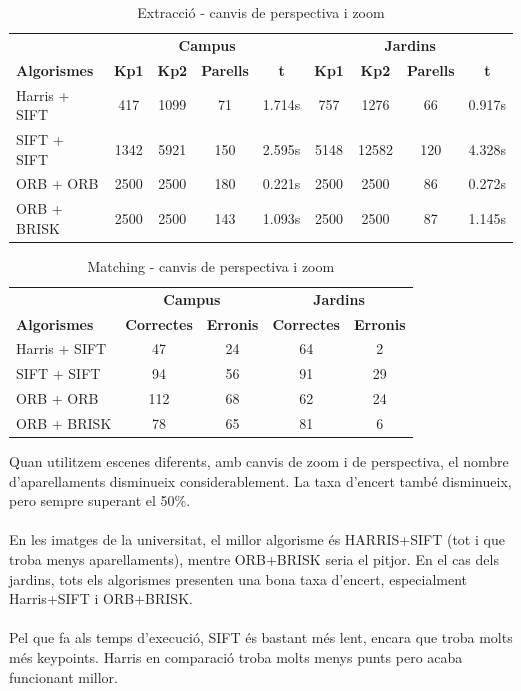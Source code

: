 		\begin{table}[H]
			\begin{center}
				\begin{tabular}{l | c c c c | c c c c}
					& \multicolumn{4}{c|}{\textbf{Campus}} & \multicolumn{4}{c}{\textbf{Jardins}} \\
					\textbf{Algorismes} & \textbf{Kp1} & \textbf{Kp2} & \textbf{Parells} & \textbf{t} & \textbf{Kp1} & \textbf{Kp2} & \textbf{Parells} & \textbf{t} \\ \hline
					Harris + SIFT & 417 & 1099 & 71 & 1.714s & 757 & 1276 & 66 & 0.917s \\
					SIFT + SIFT & 1342 & 5921 & 150 & 2.595s & 5148 & 12582 & 120 & 4.328s \\
					ORB + ORB & 2500 & 2500 & 180 & 0.221s & 2500 & 2500 & 86 & 0.272s \\
					ORB + BRISK & 2500 & 2500 & 143 & 1.093s & 2500 & 2500 & 87 & 1.145s \\
				\end{tabular}
			\end{center}
			\caption{Extracció - canvis de perspectiva i zoom}
		\end{table}

		\begin{table}[H]
			\begin{center}
				\begin{tabular}{l | c c | c c}
					& \multicolumn{2}{c|}{\textbf{Campus}} & \multicolumn{2}{c}{\textbf{Jardins}} \\
					\textbf{Algorismes} & \textbf{Correctes} & \textbf{Erronis} & \textbf{Correctes} & \textbf{Erronis} \\ \hline
					Harris + SIFT & 47 & 24 & 64 & 2 \\
					SIFT + SIFT & 94 & 56 & 91 & 29 \\
					ORB + ORB & 112 & 68 & 62 & 24 \\
					ORB + BRISK & 78 & 65 & 81 & 6 \\
				\end{tabular}
			\end{center}
			\caption{Matching - canvis de perspectiva i zoom}
		\end{table}
		\noindent
		Quan utilitzem escenes diferents, amb canvis de zoom i de perspectiva, el nombre d'aparellaments disminueix considerablement. La taxa d'encert també disminueix, pero sempre superant el 50\%.\\\\
		En les imatges de la universitat, el millor algorisme és HARRIS+SIFT (tot i que troba menys aparellaments), mentre ORB+BRISK seria el pitjor. En el cas dels jardins, tots els algorismes presenten
		una bona taxa d'encert, especialment Harris+SIFT i ORB+BRISK.\\\\
		Pel que fa als temps d'execució, SIFT és bastant més lent, encara que troba molts més keypoints. Harris en comparació troba molts menys punts pero acaba funcionant millor.\\
		
